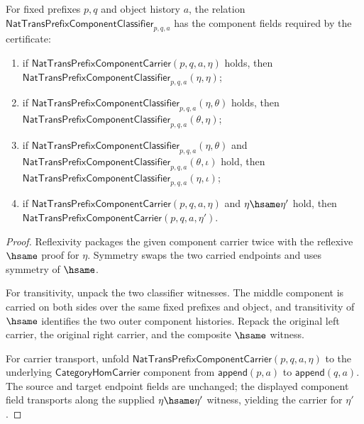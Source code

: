 \begin{theorem}
\label{thm:nattrans-prefix-component-classifier-equivalence-fields}
For fixed prefixes $p,q$ and object history $a$, the relation
$\mathsf{NatTransPrefixComponentClassifier}_{p,q,a}$ has the component fields
required by the certificate:
\begin{enumerate}
  \item if $\mathsf{NatTransPrefixComponentCarrier}(p,q,a,\eta)$ holds, then
  $\mathsf{NatTransPrefixComponentClassifier}_{p,q,a}(\eta,\eta)$;
  \item if $\mathsf{NatTransPrefixComponentClassifier}_{p,q,a}(\eta,\theta)$
  holds, then
  $\mathsf{NatTransPrefixComponentClassifier}_{p,q,a}(\theta,\eta)$;
  \item if $\mathsf{NatTransPrefixComponentClassifier}_{p,q,a}(\eta,\theta)$
  and $\mathsf{NatTransPrefixComponentClassifier}_{p,q,a}(\theta,\iota)$ hold,
  then $\mathsf{NatTransPrefixComponentClassifier}_{p,q,a}(\eta,\iota)$;
  \item if $\mathsf{NatTransPrefixComponentCarrier}(p,q,a,\eta)$ and
  $\eta\hsame\eta'$ hold, then
  $\mathsf{NatTransPrefixComponentCarrier}(p,q,a,\eta')$.
\end{enumerate}
\end{theorem}
\begin{proof}
Reflexivity packages the given component carrier twice with the reflexive
$\hsame$ proof for $\eta$. Symmetry swaps the two carried endpoints and uses
symmetry of $\hsame$.

For transitivity, unpack the two classifier witnesses. The middle component is
carried on both sides over the same fixed prefixes and object, and transitivity
of $\hsame$ identifies the two outer component histories. Repack the original
left carrier, the original right carrier, and the composite $\hsame$ witness.

For carrier transport, unfold
$\mathsf{NatTransPrefixComponentCarrier}(p,q,a,\eta)$ to the underlying
$\mathsf{CategoryHomCarrier}$ component from $\mathsf{append}(p,a)$ to
$\mathsf{append}(q,a)$. The source and target endpoint fields are unchanged;
the displayed component field transports along the supplied
$\eta\hsame\eta'$ witness, yielding the carrier for $\eta'$.
\end{proof}

